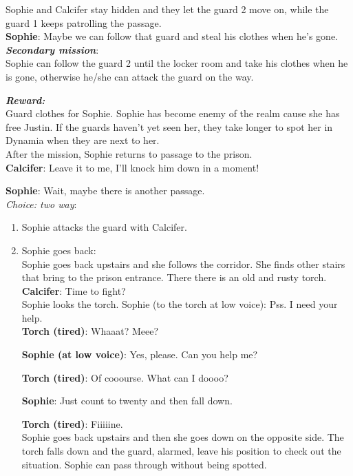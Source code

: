 \noindent Sophie and Calcifer stay hidden and they let the guard 2 move on, while the guard 1 keeps patrolling the passage.\\

\textbf{Sophie}: Maybe we can follow that guard and steal his clothes when he’s gone.\\

\noindent \textbf{\textit{Secondary mission}}: \\Sophie can follow the guard 2 until the locker room and take his clothes when he is gone, otherwise he/she can attack the guard on the way.

\noindent \textbf{\textit{Reward:}} \\Guard clothes for Sophie. Sophie has become enemy of the realm cause she has free Justin. If the guards haven't yet seen her, they take longer to spot her in Dynamia when they are next to her.\\

\noindent After the mission, Sophie returns to passage to the prison.\\

\textbf{Calcifer}: Leave it to me, I’ll knock him down in a moment!

\textbf{Sophie}: Wait, maybe there is another passage.\\

\textit{Choice: two way}:
\begin{enumerate}
\item Sophie attacks the guard with Calcifer.
\item Sophie goes back:\\

  Sophie goes back upstairs and she follows the corridor. She finds other stairs that bring to the prison entrance. There there is an old and rusty torch.\\
  
  \textbf{Calcifer}: Time to fight?\\

  \noindent Sophie looks the torch. Sophie (to the torch at low voice): Pss. I need your help.\\

  \textbf{Torch (tired)}: Whaaat? Meee?

\textbf{Sophie (at low voice)}: Yes, please. Can you help me?

\textbf{Torch (tired)}: Of cooourse. What can I doooo?

\textbf{Sophie}: Just count to twenty and then fall down.

\textbf{Torch (tired)}: Fiiiiine.\\

\noindent Sophie goes back upstairs and then she goes down on the opposite side. The torch falls down and the guard, alarmed, leave his position to check out the situation.
Sophie can pass through without being spotted.
  
  \end{enumerate}

